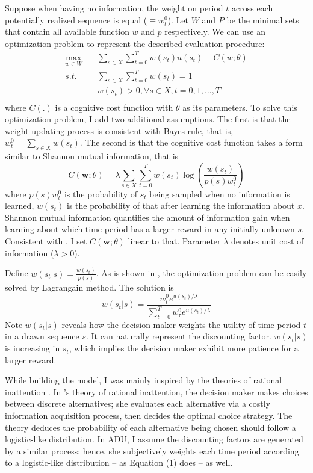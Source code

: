 \documentclass[
  12pt,
]{article}
\begin{document}
Suppose when having no information, the weight on period \(t\) across
each potentially realized sequence is equal (\(\equiv w^0_t\)). Let
\(W\) and \(P\) be the minimal sets that contain all available function
\(w\) and \(p\) respectively. We can use an optimization problem to
represent the described evaluation procedure: \[ 
\begin{aligned}
\max_{w\in W}  \quad & \sum_{s\in X}\sum_{t=0}^T w(s_t)u(s_t) - C(w;\theta) \\
s.t. \quad &  \sum_{s\in X}\sum_{t=0}^T w(s_t)=1 \\
& w(s_t)>0, \forall s\in X,t=0,1,…,T \\
\end{aligned}
\]where \(C(.)\) is a cognitive cost function with \(\theta\) as its
parameters. To solve this optimization problem, I add two additional
assumptions. The first is that the weight updating process is consistent
with Bayes rule, that is, \(w^0_t=\sum_{s\in X} w(s_t)\). The second is
that the cognitive cost function takes a form similar to Shannon mutual
information, that is\[
C(\textbf{w};\theta)= \lambda \sum_{s\in X}\sum_{t=0}^T w(s_t) \log\left(\frac{w(s_t)}{p(s)w_t^0}\right)
\]where \(p(s)w^0_t\) is the probability of \(s_t\) being sampled when
no information is learned, \(w(s_t)\) is the probability of that after
learning the information about \(x\). Shannon mutual information
quantifies the amount of information gain when learning about which time
period has a larger reward in any initially unknown \(s\). Consistent
with \citet{matejka_rational_2015}, I set \(C(\textbf{w};\theta)\)
linear to that. Parameter \(\lambda\) denotes unit cost of information
(\(\lambda>0\)).

Define \(w(s_t|s) = \frac{w(s_t)}{p(s)}\). As is shown in
\citet{matejka_rational_2015}, the optimization problem can be easily
solved by Lagrangain method. The solution is\[ \tag{1}
w(s_t|s) =\frac{w_t^0e^{u(s_t)/\lambda}}{\sum_{t=0}^T w_\tau^0 e^{u(s_t)/\lambda}}
\]Note \(w(s_t|s)\) reveals how the decision maker weights the utility
of time period \(t\) in a drawn sequence \(s\). It can naturally
represent the discounting factor. \(w(s_t|s)\) is increasing in \(s_t\),
which implies the decision maker exhibit more patience for a larger
reward.

While building the model, I was mainly inspired by the theories of
rational inattention
\citep{matejka_rational_2015, jung_discrete_2019, mackowiak_rational_2023}.
In \citet{matejka_rational_2015}'s theory of rational inattention, the
decision maker makes choices between discrete alternatives; she
evaluates each alternative via a costly information acquisition process,
then decides the optimal choice strategy. The theory deduces the
probability of each alternative being chosen should follow a
logistic-like distribution. In ADU, I assume the discounting factors are
generated by a similar process; hence, she subjectively weights each
time period according to a logistic-like distribution -- as Equation (1)
does -- as well.
\end{document}
